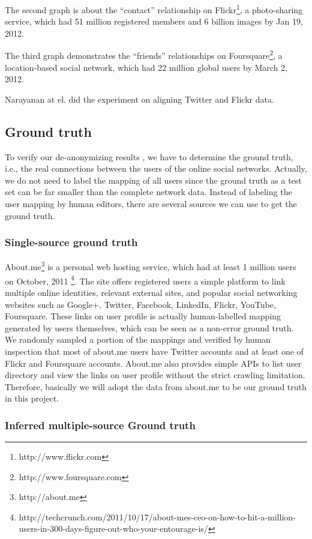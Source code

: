 \documentclass[11pt,letterpaper]{article}
\begin{document}
The second graph is about the ``contact'' relationship on Flickr\footnote{http://www.flickr.com}, a photo-sharing service, which had 51 million registered members and 6 billion images by Jan 19, 2012.

The third graph demonstrates the ``friends'' relationships on Foursquare\footnote{http://www.foursquare.com}, a location-based social network, which had 22 million global users by March 2, 2012. 

Narayanan at el. \cite{Narayanan2008} did the experiment on aligning Twitter and Flickr data.

\subsection{Ground truth}
To verify our de-anonymizing results , we have to determine the ground truth, i.e., the real connections between the users of the online social networks. Actually, we do not need to label the mapping of all users since the ground truth as a test set can be far smaller than the complete network data.
Instead of labeling the user mapping by human editors, there are several sources we can use to get the ground truth. 

\subsubsection{Single-source ground truth}

About.me\footnote{http://about.me} is a personal web hosting service, which had at least 1 million users on October, 2011 \footnote{http://techcrunch.com/2011/10/17/about-mes-ceo-on-how-to-hit-a-million-users-in-300-days-figure-out-who-your-entourage-is/}. The site offers registered users a simple platform to link multiple online identities, relevant external sites, and popular social networking websites such as Google+, Twitter, Facebook, LinkedIn, Flickr, YouTube, Foursquare. These links on user profile is actually human-labelled mapping generated by users themselves, which can be seen as a non-error ground truth.  We randomly sampled a portion of the mappings and verified by human inspection that most of about.me users have Twitter accounts and at least one of Flickr and Foursquare accounts. About.me also provides simple APIs to list user directory and view the links on user profile without the strict crawling limitation. Therefore, basically we will adopt the data from about.me to be our ground truth in this project.

\subsubsection{Inferred multiple-source Ground truth}
\end{document}

